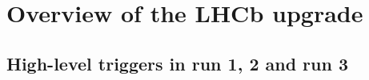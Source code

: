 \chapter{Overview of the LHCb upgrade}
\label{ref:lhcb-upgrade-overview}


\section{High-level triggers in run 1, 2 and run 3}
\label{ref:lhcb-upgrade-overview:hlt}
